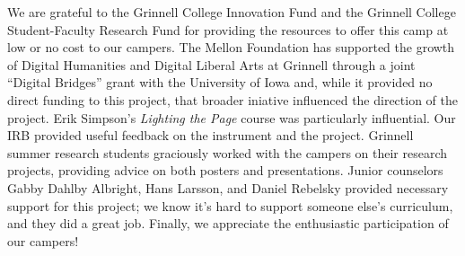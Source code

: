 \begin{acks}
We are grateful to the Grinnell College Innovation Fund and the
Grinnell College Student-Faculty Research Fund for providing the
resources to offer this camp at low or no cost to our campers.  The
Mellon Foundation has supported the growth of Digital Humanities
and Digital Liberal Arts
at Grinnell through a joint ``Digital Bridges'' grant with the
University of Iowa and, while it provided no direct funding to this
project, that broader iniative influenced the direction of the
project.  Erik Simpson's \textit{Lighting the Page} course was particularly
influential.  Our IRB provided useful feedback on the instrument
and the project.  Grinnell summer research students graciously
worked with the campers on their research projects, providing advice
on both posters and presentations.  Junior counselors Gabby Dahlby
Albright, Hans Larsson, and Daniel Rebelsky provided necessary
support for this project; we know it's hard to support someone
else's curriculum, and they did a great job.  Finally, we appreciate
the enthusiastic participation of our campers!  
\end{acks}
